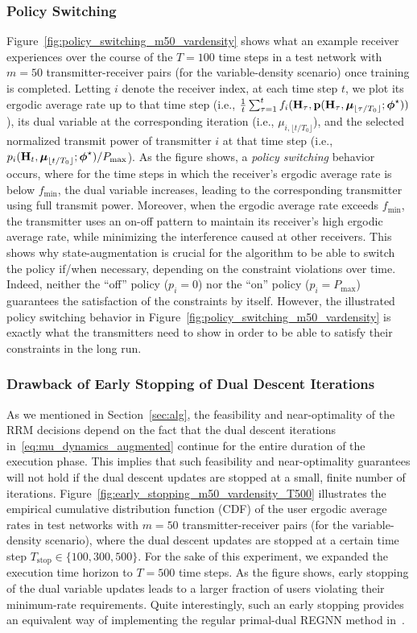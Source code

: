 \documentclass[lettersize,journal]{IEEEtran}
\begin{document}
\subsubsection{Policy Switching}
Figure~\ref{fig:policy_switching_m50_vardensity} shows what an example receiver experiences over the course of the $T=100$ time steps in a test network with $m=50$ transmitter-receiver pairs (for the variable-density scenario) once training is completed. Letting $i$ denote the receiver index, at each time step $t$, we plot its ergodic average rate up to that time step (i.e., $\frac{1}{t} \sum_{\tau=1}^t f_i({\mathbf H}_{\tau}, {\mathbf p}({\mathbf H}_{\tau},\boldsymbol{\mu}_{\lfloor \tau / T_0 \rfloor};\boldsymbol{\phi}^{\star}))$), its dual variable at the corresponding iteration (i.e., $\mu_{i,\lfloor t / T_0 \rfloor}$), and the selected normalized transmit power of transmitter $i$ at that time step (i.e., $p_i({\mathbf H}_t,\boldsymbol{\mu}_{\lfloor t / T_0 \rfloor};\boldsymbol{\phi}^{\star}) / P_{\max}$). As the figure shows, a \emph{policy switching} behavior occurs, where for the time steps in which the receiver's ergodic average rate is below $f_{\min}$, the dual variable increases, leading to the corresponding transmitter using full transmit power. Moreover, when the ergodic average rate exceeds $f_{\min}$, the transmitter uses an on-off pattern to maintain its receiver's high ergodic average rate, while minimizing the interference caused at other receivers. This shows why state-augmentation is crucial for the algorithm to be able to switch the policy if/when necessary, depending on the constraint violations over time. Indeed, neither the ``off'' policy ($p_i=0$) nor the ``on'' policy ($p_i=P_{\max}$) guarantees the satisfaction of the constraints by itself. However, the illustrated policy switching behavior in Figure~\ref{fig:policy_switching_m50_vardensity} is exactly what the transmitters need to show in order to be able to satisfy their constraints in the long run.

\subsubsection{Drawback of Early Stopping of Dual Descent Iterations}
As we mentioned in Section~\ref{sec:alg}, the feasibility and near-optimality of the RRM decisions depend on the fact that the dual descent iterations in~\eqref{eq:mu_dynamics_augmented} continue for the entire duration of the execution phase. This implies that such feasibility and near-optimality guarantees will not hold if the dual descent updates are stopped at a small, finite number of iterations. Figure~\ref{fig:early_stopping_m50_vardensity_T500} illustrates the empirical cumulative distribution function (CDF) of the user ergodic average rates in test networks with $m=50$ transmitter-receiver pairs (for the variable-density scenario), where the dual descent updates are stopped at a certain time step $T_{\text{stop}} \in \{100, 300, 500\}$. For the sake of this experiment, we expanded the execution time horizon to $T=500$ time steps. As the figure shows, early stopping of the dual variable updates leads to a larger fraction of users violating their minimum-rate requirements. Quite interestingly, such an early stopping provides an equivalent way of implementing the regular primal-dual REGNN method in~\cite{eisen2020optimal}.
\end{document}
